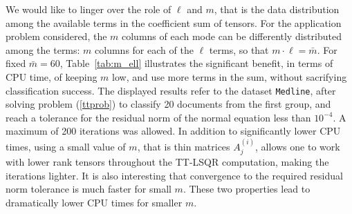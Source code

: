 \documentclass{siamart190516}
\begin{document}
We would like to linger over the role of $\ell$
and $m$, that is the data distribution among the available
terms in the coefficient sum of tensors. For the application problem considered,
 the $m$ columns of each mode can be differently distributed among the
 terms: $m$ columns for each of the $\ell$ terms, so that $m \cdot \ell = \bar m$.
 For fixed $\bar m=60$,
 Table~\ref{tab:m_ell} illustrates the significant benefit, in terms of CPU time, of keeping $m$ low,
 and use more terms in the sum, without
 sacrifying classification success. The displayed results refer to the dataset {\tt Medline},
 after solving problem (\ref{ttprob}) to classify 20 documents from the first group, and reach a tolerance for the
 residual norm of the normal equation less than $10^{-4}$. A maximum of 200 iterations was allowed.
 In addition to significantly lower CPU times, using a small value of $m$,
 that is thin matrices $A_j^{(i)}$, allows one to work with lower rank tensors 
 throughout the TT-LSQR computation, making the iterations lighter. It is also
 interesting that convergence to the required
 residual norm tolerance is much faster for
 small $m$. These two properties lead to  dramatically lower
 CPU times for smaller $m$.
 



\end{document}
